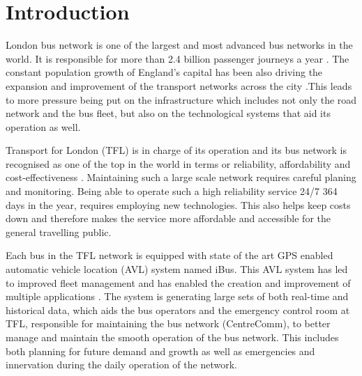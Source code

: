 \chapter{Introduction}
London bus network is one of the largest and most advanced bus networks in the world. It is responsible for more than 2.4 billion passenger journeys a year \cite{TFL1}. The constant population growth of England's capital has been also driving the expansion and improvement of the transport networks across the city \cite{TFL2}.This leads to more pressure being put on the infrastructure which includes not only the road network and the bus fleet, but also on the technological systems that aid its operation as well.

Transport for London (TFL) is in charge of its operation and its bus network is recognised as one of the top in the world in terms or reliability, affordability and cost-effectiveness \cite{TFL1}. Maintaining such a large scale network requires careful planing and monitoring. Being able to operate such a high reliability service 24/7 364 days in the year, requires employing new technologies. This also helps keep costs down and therefore makes the service more affordable and accessible for the general travelling public. 

Each bus in the TFL network is equipped with state of the art GPS enabled automatic vehicle location (AVL) system named iBus\cite{ibusdeployment}. This AVL system has led to improved fleet management and has enabled the creation and improvement of multiple applications \cite{eps354267}. The system is generating large sets of both real-time and historical data, which aids the bus operators and the emergency control room at TFL, responsible for maintaining the bus network (CentreComm), to better manage and maintain the smooth operation of the bus network. This includes both planning for future demand and growth as well as emergencies and innervation during the daily operation of the network. 

